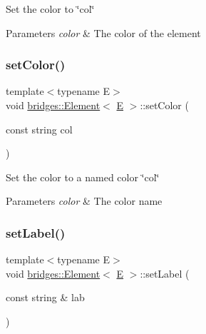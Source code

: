 Set the color to \char`\"{}col\char`\"{} 
\begin{DoxyParams}{Parameters}
{\em color} & The color of the element \\
\hline
\end{DoxyParams}
\mbox{\label{classbridges_1_1_element_a7c3a0f9fb1c370e4ade6656491343522}} 
\subsubsection{\texorpdfstring{setColor()}{setColor()}\hspace{0.1cm}{\footnotesize\ttfamily [2/2]}}
{\footnotesize\ttfamily template$<$typename E$>$ \\
void \mbox{\hyperlink{classbridges_1_1_element}{bridges\+::\+Element}}$<$ \mbox{\hyperlink{namespacebridges_acfb0a4f7877d8f63de3e6862004c50eda3a3ea00cfc35332cedf6e5e9a32e94da}{E}} $>$\+::set\+Color (\begin{DoxyParamCaption}\item[{const string}]{col }\end{DoxyParamCaption})\hspace{0.3cm}{\ttfamily [inline]}}

Set the color to a named color \char`\"{}col\char`\"{} 
\begin{DoxyParams}{Parameters}
{\em color} & The color name \\
\hline
\end{DoxyParams}
\mbox{\label{classbridges_1_1_element_a22313b74452175d07650168a701daa99}} 
\subsubsection{\texorpdfstring{setLabel()}{setLabel()}}
{\footnotesize\ttfamily template$<$typename E$>$ \\
void \mbox{\hyperlink{classbridges_1_1_element}{bridges\+::\+Element}}$<$ \mbox{\hyperlink{namespacebridges_acfb0a4f7877d8f63de3e6862004c50eda3a3ea00cfc35332cedf6e5e9a32e94da}{E}} $>$\+::set\+Label (\begin{DoxyParamCaption}\item[{const string \&}]{lab }\end{DoxyParamCaption})\hspace{0.3cm}{\ttfamily [inline]}}

